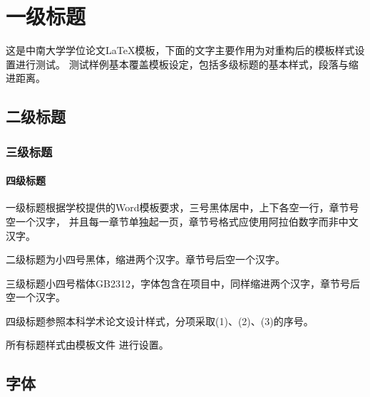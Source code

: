 %
%
%
%
%

\chapter{一级标题}

这是中南大学学位论文\LaTeX{}模板，下面的文字主要作用为对重构后的模板样式设置进行测试。
测试样例基本覆盖模板设定，包括多级标题的基本样式，段落与缩进距离。

\section{二级标题}

\subsection{三级标题}

\subsubsection{四级标题}

一级标题根据学校提供的Word模板要求，三号黑体居中，上下各空一行，章节号空一个汉字，
并且每一章节单独起一页，章节号格式应使用阿拉伯数字而非中文汉字。

二级标题为小四号黑体，缩进两个汉字。章节号后空一个汉字。

三级标题小四号楷体GB2312，字体包含在项目中，同样缩进两个汉字，章节号后空一个汉字。

四级标题参照本科学术论文设计样式，分项采取(1)、(2)、(3)的序号。

所有标题样式由模板文件  进行设置。

\section{字体}

